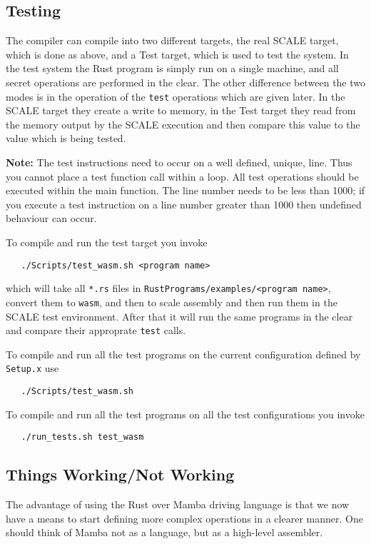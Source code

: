 \subsection{Testing}
The compiler can compile into two different targets,
the real SCALE target, which is done as above,
and a Test target, which is used to test the system.
In the test system the Rust program is simply run on a single
machine, and all secret operations are performed in the clear.
The other difference between the two modes is in the operation
of the \verb|test| operations which are given later.
In the SCALE target they create a write to memory, in the
Test target they read from the memory output by the SCALE
execution and then compare this value to the value which
is being tested.

\vspace{3mm}

\noindent
{\bf Note:} The test instructions need to occur on a well
defined, unique, line. Thus you cannot place a test function call
within a loop. All test operations should be executed within
the main function.
The line number needs to be less than 1000; if you execute
a test instruction on a line number greater than 1000 then
undefined behaviour can occur.

To compile and run the test target you invoke
\begin{verbatim}
   ./Scripts/test_wasm.sh <program name>
\end{verbatim}
which will take all \verb|*.rs| files in \verb|RustPrograms/examples/<program name>|,
convert them to \verb|wasm|, and then to scale assembly and then run
them in the SCALE test environment. After that it will run the
same programs in the clear and compare their approprate \verb|test| calls.

To compile and run all the test programs on the current configuration
defined by \verb|Setup.x| use
\begin{verbatim}
   ./Scripts/test_wasm.sh
\end{verbatim}
To compile and run all the test programs on all the test configurations you invoke
\begin{verbatim}
   ./run_tests.sh test_wasm
\end{verbatim}

\subsection{Things Working/Not Working}
The advantage of using the Rust over Mamba driving language is that we now
have a means to start defining more complex operations in a clearer manner.
One should think of Mamba not as a language, but as a high-level assembler.

